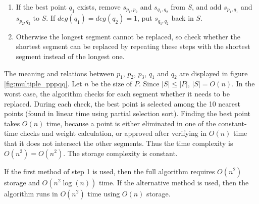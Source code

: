 \documentclass[11pt]{article}
\begin{document}
\begin{enumerate}
\item\label{multi-algo-replace} If the best point $q_1$ exists, remove $s_{p_1,p_2}$ and $s_{q_1,q_2}$ from $S$, and add $s_{p_1,q_1}$ and $s_{p_2,q_2}$ to $S$.
If $deg(q_1) = deg(q_2) = 1$, put $s_{q_1,q_2}$ back in $S$.
\item Otherwise the longest segment cannot be replaced, so check whether the shortest segment can be replaced by repeating these steps with the shortest segment instead of the longest one.
\end{enumerate}


The meaning and relations between $p_1$, $p_2$, $p_3$, $q_1$ and $q_2$ are displayed in figure \ref{fig:multiple_pppqq}.
Let $n$ be the size of $P$. Since $|S| \leq |P|$, $|S| = O(n)$.
In the worst case, the algorithm checks for each segment whether it needs to be replaced.
During each check, the best point is selected among the 10 nearest points (found in linear time using partial selection sort).
Finding the best point takes $O(n)$ time, because a point is either eliminated in one of the constant-time checks and weight calculation, or approved after verifying in $O(n)$ time that it does not intersect the other segments.
Thus the time complexity is $O(n^2) = O(n^2)$. The storage complexity is constant.

If the first method of step 1 is used, then the full algorithm requires $O(n^2)$ storage and $O(n^2\log(n))$ time. If the alternative method is used, then the algorithm runs in $O(n^2)$ time using $O(n)$ storage.
\end{document}

